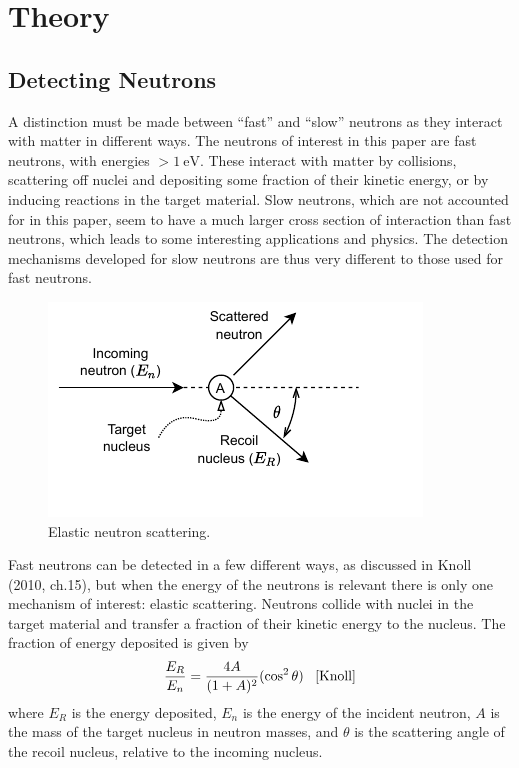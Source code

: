 \documentclass[11pt]{article}
\numberwithin{equation}{section}
\numberwithin{figure}{section}
\numberwithin{table}{section}
\begin{document}
\section{Theory}\label{sec:Theory}
\subsection{Detecting Neutrons}
\par A distinction must be made between ``fast'' and ``slow'' neutrons as they interact with matter in different ways. The neutrons of interest in this paper are fast neutrons, with energies $>\SI{1}{\electronvolt}$. These interact with matter by collisions, scattering off nuclei and depositing some fraction of their kinetic energy, or by inducing reactions in the target material. Slow neutrons, which are not accounted for in this paper, seem to have a much larger cross section of interaction than fast neutrons, which leads to some interesting applications and physics. The detection mechanisms developed for slow neutrons are thus very different to those used for fast neutrons. \cite{Knoll}
\begin{figure}
    \includegraphics{Plots/neutronScattering.pdf}
    \caption{Elastic neutron scattering.}
    \label{fig:neutron scattering diagram}
\end{figure}
\par Fast neutrons can be detected in a few different ways, as discussed in Knoll (2010, ch.15), but when the energy of the neutrons is relevant there is only one mechanism of interest: elastic scattering. Neutrons collide with nuclei in the target material and transfer a fraction of their kinetic energy to the nucleus. The fraction of energy deposited is given by
\begin{equation}
    \frac{E_R}{E_n}=\frac{4A}{(1+A)^2}(\cos^2\theta)\;\;\;\cite{Knoll}
    \label{eqn:Neutron scattering fraction}
\end{equation}
where $E_R$ is the energy deposited, $E_n$ is the energy of the incident neutron, $A$ is the mass of the target nucleus in neutron masses, and $\theta$ is the scattering angle of the recoil nucleus, relative to the incoming nucleus. 
\end{document}

